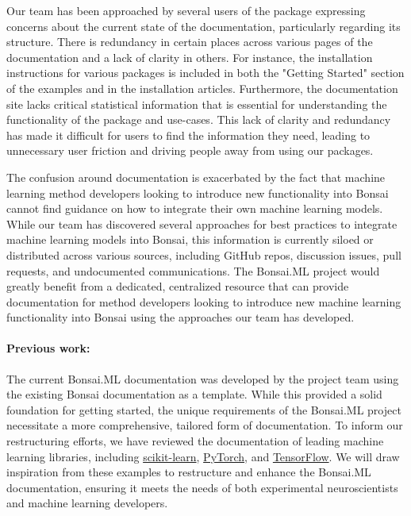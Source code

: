 Our team has been approached by several users of the package expressing concerns about the current state of the documentation, particularly regarding its structure. There is redundancy in certain places across various pages of the documentation and a lack of clarity in others. For instance, the installation instructions for various packages is included in both the "Getting Started" section of the examples and in the installation articles. Furthermore, the documentation site lacks critical statistical information that is essential for understanding the functionality of the package and use-cases. This lack of clarity and redundancy has made it difficult for users to find the information they need, leading to unnecessary user friction and driving people away from using our packages.

The confusion around documentation is exacerbated by the fact that machine learning method developers looking to introduce new functionality into Bonsai cannot find guidance on how to integrate their own machine learning models. While our team has discovered several approaches for best practices to integrate machine learning models into Bonsai, this information is currently siloed or distributed across various sources, including GitHub repos, discussion issues, pull requests, and undocumented communications. The Bonsai.ML project would greatly benefit from a dedicated, centralized resource that can provide documentation for method developers looking to introduce new machine learning functionality into Bonsai using the approaches our team has developed.

\paragraph{Previous work:} The current Bonsai.ML documentation was developed by the project team using the existing Bonsai documentation as a template. While this provided a solid foundation for getting started, the unique requirements of the Bonsai.ML project necessitate a more comprehensive, tailored form of documentation. To inform our restructuring efforts, we have reviewed the documentation of leading machine learning libraries, including \href{https://scikit-learn.org/stable/documentation.html}{scikit-learn}, \href{https://pytorch.org/docs/stable/index.html}{PyTorch}, and \href{https://tensorflow.org/learn}{TensorFlow}. We will draw inspiration from these examples to restructure and enhance the Bonsai.ML documentation, ensuring it meets the needs of both experimental neuroscientists and machine learning developers.

